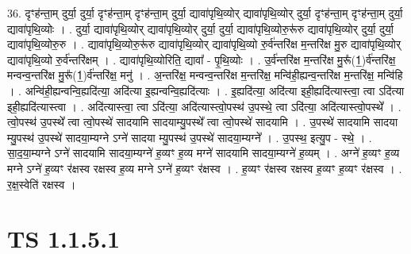 \documentclass[17pt]{extarticle}
\begin{document}
36. दृꣳह॑न्ता॒म् दुर्या॒ दुर्या॒ दृꣳह॑न्ता॒म् दृꣳह॑न्ता॒म् दुर्या॒ द्यावा॑पृथि॒व्योर् द्यावा॑पृथि॒व्योर् दुर्या॒ दृꣳह॑न्ता॒म् दृꣳह॑न्ता॒म् दुर्या॒ द्यावा॑पृथि॒व्योः । . दुर्या॒ द्यावा॑पृथि॒व्योर् द्यावा॑पृथि॒व्योर् दुर्या॒ दुर्या॒ द्यावा॑पृथि॒व्योरु॒रू॑रु द्यावा॑पृथि॒व्योर् दुर्या॒ दुर्या॒ द्यावा॑पृथि॒व्योरु॒रु । . द्यावा॑पृथि॒व्योरु॒रू॑रु द्यावा॑पृथि॒व्योर् द्यावा॑पृथि॒व्यो रु॒र्व॑न्तरि॑क्ष म॒न्तरि॑क्ष मु॒रु द्यावा॑पृथि॒व्योर् द्यावा॑पृथि॒व्यो रु॒र्व॑न्तरि॑क्षम् । . द्यावा॑पृथि॒व्योरिति॒ द्यावा᳚ - पृ॒थि॒व्योः । . उ॒र्व॑न्तरि॑क्ष म॒न्तरि॑क्ष मु॒रू᳚(1॒)र्व॑न्तरि॑क्ष॒ मन्वन्व॒न्तरि॑क्ष मु॒रू᳚(1॒)र्व॑न्तरि॑क्ष॒ मनु॑ । . अ॒न्तरि॑क्ष॒ मन्वन्व॒न्तरि॑क्ष म॒न्तरि॑क्ष॒ मन्वि॑ही॒ह्यन्व॒न्तरि॑क्ष म॒न्तरि॑क्ष॒ मन्वि॑हि । . अन्वि॑ही॒ह्यन्वन्वि॒ह्यदि॑त्या॒ अदि॑त्या इ॒ह्यन्वन्वि॒ह्यदि॑त्याः । . इ॒ह्यदि॑त्या॒ अदि॑त्या इही॒ह्यदि॑त्यास्त्वा॒ त्वा ऽदि॑त्या इही॒ह्यदि॑त्यास्त्वा । . अदि॑त्यास्त्वा॒ त्वा ऽदि॑त्या॒ अदि॑त्यास्त्वो॒पस्थ॑ उ॒पस्थे॒ त्वा ऽदि॑त्या॒ अदि॑त्यास्त्वो॒पस्थे᳚ । . त्वो॒पस्थ॑ उ॒पस्थे᳚ त्वा त्वो॒पस्थे॑ सादयामि सादयाम्यु॒पस्थे᳚ त्वा त्वो॒पस्थे॑ सादयामि । . उ॒पस्थे॑ सादयामि सादया म्यु॒पस्थ॑ उ॒पस्थे॑ सादया॒म्यग्ने ऽग्ने॑ सादया म्यु॒पस्थ॑ उ॒पस्थे॑ सादया॒म्यग्ने᳚ । . उ॒पस्थ॒ इत्यु॒प - स्थे॒ । . सा॒द॒या॒म्यग्ने ऽग्ने॑ सादयामि सादया॒म्यग्ने॑ ह॒व्यꣳ ह॒व्य मग्ने॑ सादयामि सादया॒म्यग्ने॑ ह॒व्यम् । . अग्ने॑ ह॒व्यꣳ ह॒व्य मग्ने ऽग्ने॑ ह॒व्यꣳ र॑क्षस्व रक्षस्व ह॒व्य मग्ने ऽग्ने॑ ह॒व्यꣳ र॑क्षस्व । . ह॒व्यꣳ र॑क्षस्व रक्षस्व ह॒व्यꣳ ह॒व्यꣳ र॑क्षस्व । . र॒क्ष॒स्वेति॑ रक्षस्व । \newline
\pagebreak
{}
\section*{ TS 1.1.5.1 }
\end{document}
